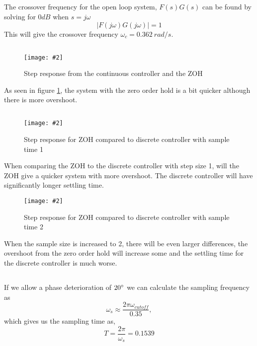 \documentclass[12pt,a4paper]{article}
\newcommand{\fig}[4]{
    \begin{figure}[!h]
      \centering
      \texttt{[image: \#2]}
        \label{fig:#3}
        \caption{#4}
    \end{figure}
}
\begin{document}
  \subsection{}%
  The crossover frequency for the open loop system, $F(s)G(s)$ can be
  found by solving for $0dB$ when $s=j\omega$
  \begin{equation}
    |F(j\omega)G(j\omega)|=1
  \end{equation}
  This will give the crossover frequency $\omega_c=0.362\:rad/s$.

  \subsection{}%

  \fig{0.4}{con_zero_compare.png}{cont_zero_step}{Step response
  from the continuous controller and the ZOH}
  As seen in figure \ref{fig:cont_zero_step}, the system with the zero
  order hold is a bit quicker although there is more overshoot.

  \subsection{}%

  \fig{0.4}{zero_dis_comp_sample_1.png}{zoh_dis_comp_s1}{Step response
  for ZOH compared to discrete controller with sample time 1}
  When comparing the ZOH to the discrete controller with step size 1, will the ZOH give a
  quicker system with more overshoot. The discrete controller will have
  significantly longer settling time.\\

  \fig{0.4}{zero_dis_comp_sample_2.png}{zoh_dis_comp_s2}{Step response
  for ZOH compared to discrete controller with sample time 2}
  When the sample size is increased to 2, there will be even larger
  differences, the overshoot from the zero order hold will increase some
  and the settling time for the discrete controller is much worse.

  \subsection{}%
  If we allow a phase deterioration of $20\degree$ we can calculate the
  sampling frequency as 
  \begin{equation}
    \omega_s\approx \frac{2\pi\omega_{cutoff}}{0.35},
  \end{equation}
  which gives us the sampling time as,
  \begin{equation}
    T=\frac{2\pi}{\omega_s}=0.1539
  \end{equation}
\end{document}
